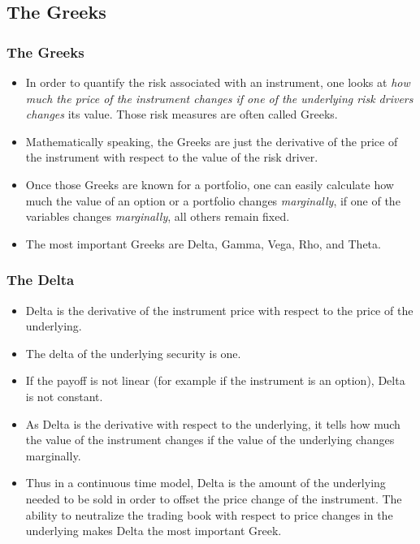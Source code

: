 \subsection{The Greeks}
\begin{frame}[fragile]
\frametitle{The Greeks}
\begin{itemize}
\item In order to quantify the risk associated with an instrument, one looks at
\emph{ how much the price of the instrument changes if one of the underlying
risk drivers changes} its value. Those risk measures are often called
Greeks.
\item Mathematically speaking, the Greeks are just the derivative of the price
of the instrument with respect to the value of the risk driver.
\item Once those Greeks are known for a portfolio, one can easily calculate how
much the value of an option or a portfolio changes \emph{marginally}, if one of
the variables changes \emph{marginally}, all others remain fixed.
\item The most important Greeks are Delta, Gamma, Vega, Rho, and Theta.
\end{itemize}
\end{frame}

\begin{frame}[fragile]
\frametitle{The Delta}
\begin{itemize}
\item Delta is the derivative of the instrument price with respect to the price
of the underlying.
\item The delta of the underlying security is one.
\item If the payoff is not linear (for example if the instrument is an option),
Delta is not constant.
\item As Delta is the derivative with respect to the underlying, it tells how
much the value of the instrument changes if the value of the underlying changes
marginally.
\item Thus in a continuous time model, Delta is the amount of the underlying
needed to be sold in order to offset the price change of the instrument. The
ability to neutralize the trading book with respect to price changes in the
underlying makes Delta the most important Greek.
\end{itemize}
\end{frame}

